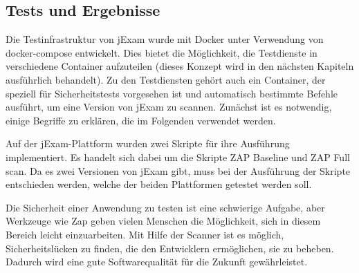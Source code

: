 \subsection{Tests und Ergebnisse}

Die Testinfrastruktur von jExam wurde mit Docker unter Verwendung
von docker-compose entwickelt. Dies bietet die Möglichkeit, die
Testdienste in verschiedene Container aufzuteilen (dieses Konzept
wird in den nächsten Kapiteln ausführlich behandelt). Zu den
Testdiensten gehört auch ein Container, der speziell für Sicherheitstests
vorgesehen ist und automatisch bestimmte Befehle ausführt, um eine Version
von jExam zu scannen. Zunächst ist es notwendig, einige Begriffe zu
erklären, die im Folgenden verwendet werden.







Auf der jExam-Plattform wurden zwei Skripte für ihre Ausführung
implementiert. Es handelt sich dabei um die Skripte ZAP Baseline und
ZAP Full scan.  Da es zwei Versionen von jExam gibt, muss bei der
Ausführung der Skripte entschieden werden, welche der beiden Plattformen
getestet werden soll.






Die Sicherheit einer Anwendung zu testen ist eine schwierige Aufgabe,
aber Werkzeuge wie Zap geben vielen Menschen die Möglichkeit, sich in
diesem Bereich leicht einzuarbeiten. Mit Hilfe der Scanner ist es möglich,
Sicherheitslücken zu finden, die den Entwicklern ermöglichen, sie zu
beheben. Dadurch wird eine gute Softwarequalität für die Zukunft gewährleistet.







